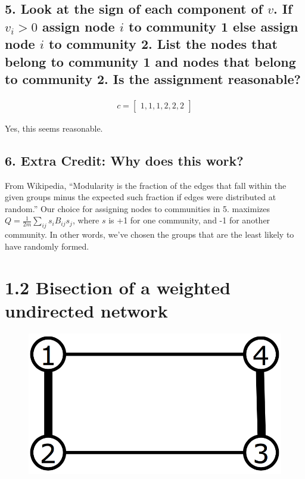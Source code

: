 \documentclass{tufte-handout}
\begin{document}
\subsection{5. Look at the sign of each component of $v$. If $v_i > 0$ assign node $i$ to community 1 else assign node $i$ to community 2. List the nodes that belong to community 1 and nodes that belong to community 2. Is the assignment reasonable?}

\begin{align*}
c =
\begin{bmatrix} 1, 1, 1, 2, 2, 2
\end{bmatrix}
\end{align*}

Yes, this seems reasonable.

\subsection{6. Extra Credit: Why does this work?}

From Wikipedia, ``Modularity is the fraction of the edges that fall within the given groups minus the expected such fraction if edges were distributed at random.'' Our choice for assigning nodes to communities in 5. maximizes $Q = \frac{1}{2m} \sum_{ij} s_i B_{ij} s_j$, where $s$ is +1 for one community, and -1 for another community. In other words, we've chosen the groups that are the least likely to have randomly formed.

\section{1.2 Bisection of a weighted undirected network}
\begin{figure}
  \includegraphics[width=0.5\linewidth]{1-2.png}
  \label{fig:textfig}
\end{figure}
\end{document}
